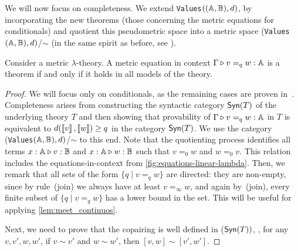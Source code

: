 We will now focus on completeness. We extend  \texttt{Values}$((\mathbb{A},\mathbb{B}),d)$, by incorporating the new theorems (those concerning the metric equations for conditionals) and quotient this pseudometric space into a metric space (\texttt{Values}$(\mathbb{A},\mathbb{B}),d)$/$\sim$ (in the same spirit as before, see ).


\begin{theorem}[Completeness]
Consider a  metric $\lambda$-theory. A metric equation in context
$\Gamma \triangleright v =_{q} w : \mathbb{A}$
is a theorem if and only if it holds in all models of the theory.
\end{theorem}

\begin{proof}
  We will focus only on conditionals, as the remaining cases are proven in~\cite{dahlqvist2023syntactic}.
  Completeness arises from constructing the syntactic category $\mathsf{Syn}(T)$ of the underlying  theory
  $T$ and then showing that provability of $\Gamma \triangleright v =_q w : \mathbb{A}$
  in $T$ is equivalent to $d(\left \llbracket v \right \rrbracket,\left \llbracket w \right \rrbracket) \geq q$ in the category
  $\mathsf{Syn}(T)$. We use the category (\texttt{Values}$(\mathbb{A},\mathbb{B}),d)$/$\sim$ to this end.  Note that the quotienting process identifies all terms $x : \mathbb{A} \triangleright v : \mathbb{B}$ and $x : \mathbb{A} \triangleright w : \mathbb{B}$ such that $v =_0 w$ and $w =_0 v$. This relation includes the equations-in-context from \autoref{fig:equations-linear-lambda}.
     Then, we remark that all sets of the form $\{ q \mid v =_q w \}$ are directed: they are non-empty, since by rule~(join) we always have at least $v =_{\infty} w$, and again by~(join), every finite subset of $\{ q \mid v =_q w \}$ has a lower bound in the set. This will be useful for applying \autoref{lem:meet_continuos}.
   
   Next, we need to prove that the copairing is well defined in ($\mathsf{Syn}(T))$, \ie, for any $v, v', w, w'$, if $v\sim v'$ and $w\sim w'$, then $[v,w] \sim [v',w']$. 


\end{proof}
